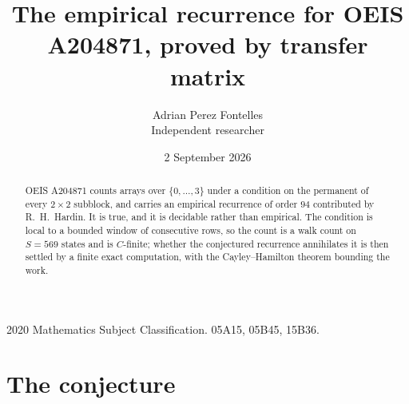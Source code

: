 \documentclass[11pt,a4paper]{article}
\title{The empirical recurrence for OEIS A204871, proved by transfer matrix}
\author{Adrian Perez Fontelles\\ \small Independent researcher}
\date{2 September 2026}
\theoremstyle{plain}
\theoremstyle{definition}
\begin{document}
\maketitle

\begin{abstract}
OEIS A204871 counts arrays over $\{0,\dots,3\}$ under a condition on the permanent of every
$2\times2$ subblock, and carries an empirical recurrence of order $94$ contributed by
R.~H.~Hardin. It is true, and it is decidable rather than empirical. The condition is local to
a bounded window of consecutive rows, so the count is a walk count on $S=569$ states and is
$C$-finite; whether the conjectured recurrence annihilates it is then settled by a finite exact
computation, with the Cayley--Hamilton theorem bounding the work.
\end{abstract}

\noindent\small 2020 Mathematics Subject Classification. 05A15, 05B45, 15B36.\normalsize

\section{The conjecture}
\end{document}
